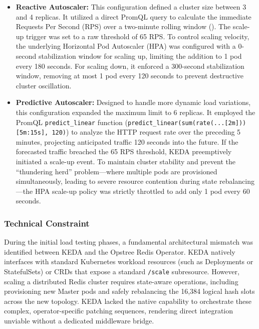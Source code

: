     \begin{itemize}
        \item \textbf{Reactive Autoscaler:} This configuration defined a cluster size between 3 and 4 replicas. It utilized a direct PromQL query to calculate the immediate Requests Per Second (RPS) over a two-minute rolling window (). The scale-up trigger was set to a raw threshold of 65 RPS. To control scaling velocity, the underlying Horizontal Pod Autoscaler (HPA) was configured with a 0-second stabilization window for scaling up, limiting the addition to 1 pod every 180 seconds. For scaling down, it enforced a 300-second stabilization window, removing at most 1 pod every 120 seconds to prevent destructive cluster oscillation.
        \item \textbf{Predictive Autoscaler:} Designed to handle more dynamic load variations, this configuration expanded the maximum limit to 6 replicas. It employed the PromQL \texttt{predict\_linear} function (\texttt{predict\_linear(sum(rate(...[2m]))[5m:15s], 120)}) to analyze the HTTP request rate over the preceding 5 minutes, projecting anticipated traffic 120 seconds into the future. If the forecasted traffic breached the 65 RPS threshold, KEDA preemptively initiated a scale-up event. To maintain cluster stability and prevent the ``thundering herd'' problem---where multiple pods are provisioned simultaneously, leading to severe resource contention during state rebalancing---the HPA scale-up policy was strictly throttled to add only 1 pod every 60 seconds.
    \end{itemize}

\subsubsection{Technical Constraint}
\label{subsubsec:constraint}

    During the initial load testing phases, a fundamental architectural mismatch was identified between KEDA and the Opstree Redis Operator. KEDA natively interfaces with standard Kubernetes workload resources (such as Deployments or StatefulSets) or CRDs that expose a standard \texttt{/scale} subresource. However, scaling a distributed Redis cluster requires state-aware operations, including provisioning new Master pods and safely rebalancing the 16,384 logical hash slots across the new topology. KEDA lacked the native capability to orchestrate these complex, operator-specific patching sequences, rendering direct integration unviable without a dedicated middleware bridge.

